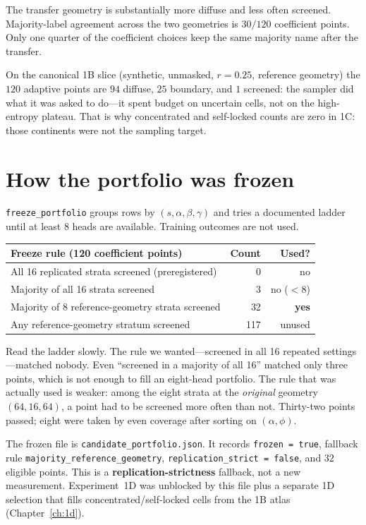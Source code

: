 \documentclass[11pt,a4paper]{report}
\begin{document}
The transfer geometry is substantially more diffuse and less often screened. Majority-label agreement across the two geometries is $30/120$ coefficient points. Only one quarter of the coefficient choices keep the same majority name after the transfer.

On the canonical 1B slice (synthetic, unmasked, $r=0.25$, reference geometry) the $120$ adaptive points are $94$ diffuse, $25$ boundary, and $1$ screened: the sampler did what it was asked to do---it spent budget on uncertain cells, not on the high-entropy plateau. That is why concentrated and self-locked counts are zero in 1C: those continents were not the sampling target.

\section{How the portfolio was frozen}
\label{sec:1c-freeze}

\texttt{freeze\_portfolio} groups rows by $(s,\alpha,\beta,\gamma)$ and tries a documented ladder until at least $8$ heads are available. Training outcomes are not used.

\begin{center}
\begin{tabular}{lrr}
\toprule
Freeze rule (120 coefficient points) & Count & Used? \\
\midrule
All 16 replicated strata screened (preregistered) & 0 & no \\
Majority of all 16 strata screened & 3 & no ($<8$) \\
Majority of 8 reference-geometry strata screened & 32 & \textbf{yes} \\
Any reference-geometry stratum screened & 117 & unused \\
\bottomrule
\end{tabular}
\end{center}

Read the ladder slowly. The rule we wanted---screened in all 16 repeated settings---matched nobody. Even ``screened in a majority of all 16'' matched only three points, which is not enough to fill an eight-head portfolio. The rule that was actually used is weaker: among the eight strata at the \emph{original} geometry $(64,16,64)$, a point had to be screened more often than not. Thirty-two points passed; eight were taken by even coverage after sorting on $(\alpha,\phi)$.

The frozen file is \texttt{candidate\_portfolio.json}. It records
\texttt{frozen = true}, fallback rule \texttt{majority\_reference\_geometry},
\texttt{replication\_strict = false}, and $32$ eligible points.
This is a \textbf{replication-strictness} fallback, not a new measurement.
Experiment~1D was unblocked by this file plus a separate 1D selection that fills concentrated/self-locked cells from the 1B atlas (Chapter~\ref{ch:1d}).
\end{document}
